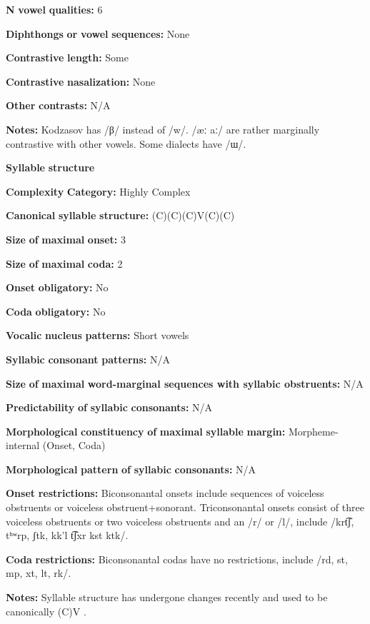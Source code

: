 \textbf{N} \textbf{vowel} \textbf{qualities:} 6

\textbf{Diphthongs} \textbf{or} \textbf{vowel} \textbf{sequences:} None

\textbf{Contrastive} \textbf{length:} Some

\textbf{Contrastive} \textbf{nasalization:} None

\textbf{Other} \textbf{contrasts:} N/A

\textbf{Notes:} Kodzasov has /β/ instead of /w/. /æː aː/ are rather marginally contrastive with other vowels. Some dialects have /ɯ/.

\textbf{Syllable} \textbf{structure}

\textbf{Complexity} \textbf{Category:} Highly Complex

\textbf{Canonical} \textbf{syllable} \textbf{structure:} (C)(C)(C)V(C)(C) \citep[40-46]{Haspelmath1993}

\textbf{Size} \textbf{of} \textbf{maximal} \textbf{onset:} 3

\textbf{Size} \textbf{of} \textbf{maximal} \textbf{coda:} 2

\textbf{Onset} \textbf{obligatory:} No

\textbf{Coda} \textbf{obligatory:} No

\textbf{Vocalic} \textbf{nucleus} \textbf{patterns:} Short vowels

\textbf{Syllabic} \textbf{consonant} \textbf{patterns:} N/A

\textbf{Size} \textbf{of} \textbf{maximal} \textbf{word{}-marginal sequences with syllabic obstruents:} N/A

\textbf{Predictability} \textbf{of} \textbf{syllabic} \textbf{consonants:} N/A

\textbf{Morphological} \textbf{constituency} \textbf{of} \textbf{maximal} \textbf{syllable} \textbf{margin:} Morpheme-internal (Onset, Coda)

\textbf{Morphological} \textbf{pattern} \textbf{of} \textbf{syllabic} \textbf{consonants:} N/A

\textbf{Onset} \textbf{restrictions:} Biconsonantal onsets include sequences of voiceless obstruents or voiceless obstruent+sonorant. Triconsonantal onsets consist of three voiceless obstruents or two voiceless obstruents and an /r/ or /l/, include /krt͡ʃ, tʰʷrp, ʃtk, kk'l t͡ʃxr kst ktk/.

\textbf{Coda} \textbf{restrictions:} Biconsonantal codas have no restrictions, include /rd, st, mp, xt, lt, rk/.

\textbf{Notes:} Syllable structure has undergone changes recently and used to be canonically (C)V \citep[46]{Haspelmath1993}.

